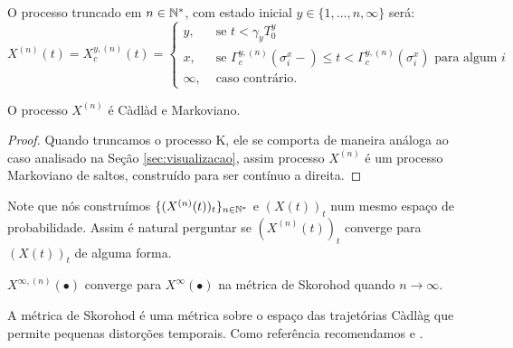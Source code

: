 O processo truncado em $n \in {\mathbb{N^*}}$, com estado inicial $y \in \{1,
\ldots, n, \infty\}$ será:
\begin{equation}
  X^{(n)}(t) = X^{y,(n)}_c(t) = \begin{cases}
    y, & \textrm{ se }  t < \gamma_y T_0^y\\
    x, & \textrm{ se } \Gamma^{y,(n)}_c(\sigma_i^x-) \leq t <
    \Gamma^{y,(n)}_c(\sigma^x_i)
    \textrm{ para algum } i \\
    \infty, & \textrm{ caso contrário.}
  \end{cases}
\end{equation}

\begin{proposicao}
  O processo $X^{(n)}$ é Càdlàd e Markoviano.
\end{proposicao}
\begin{proof}
  Quando truncamos o processo K, ele se comporta de maneira análoga ao
  caso analisado na Seção \ref{sec:visualizacao}, assim processo
  $X^{(n)}$ é um processo Markoviano de saltos, construído para ser
  contínuo a direita.
\end{proof}

Note que nós construímos $\{(X^{(n)}(t))_t\}_{n \in {\mathbb{N^*}}}$ e $(X(t))_t$
num mesmo espaço de probabilidade. Assim é natural perguntar se
$(X^{(n)}(t))_t$ converge para $(X(t))_t$ de alguma forma.

\begin{teorema}
  \label{teo:convergencia}
  $X^{\infty, (n)} (\bullet)$ converge para $X^\infty(\bullet)$ \qc na
  métrica de Skorohod quando $n \to \infty$.
\end{teorema}

A métrica de Skorohod é uma métrica sobre o espaço das trajetórias
Càdlàg que permite pequenas distorções temporais. Como
referência recomendamos \cite{billingsley:99} e \cite{ethier:86}.

